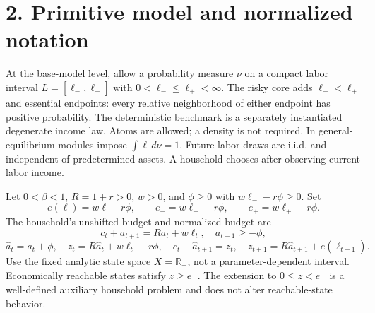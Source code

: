 \documentclass[
  11pt,
]{article}
\begin{document}
\section{2. Primitive model and normalized
notation}\label{primitive-model-and-normalized-notation}

At the base-model level, allow a probability measure \(\nu\) on a
compact labor interval \(L=[\ell_-,\ell_+]\) with
\(0<\ell_-\leq\ell_+<\infty\). The risky core adds \(\ell_-<\ell_+\) and
essential endpoints: every relative neighborhood of either endpoint has
positive probability. The deterministic benchmark is a separately
instantiated degenerate income law. Atoms are allowed; a density is not
required. In general-equilibrium modules impose \(\int\ell\,d\nu=1\).
Future labor draws are i.i.d. and independent of predetermined assets. A
household chooses after observing current labor income.

Let \(0<\beta<1\), \(R=1+r>0\), \(w>0\), and \(\phi\geq0\) with
\(w\ell_- -r\phi\geq0\). Set \[
e(\ell)=w\ell-r\phi,\qquad e_-=w\ell_- -r\phi,\qquad e_+=w\ell_+-r\phi.
\] The household's unshifted budget and normalized budget are \[
c_t+a_{t+1}=R a_t+w\ell_t,\quad a_{t+1}\geq-\phi,
\] \[
\widehat a_t=a_t+\phi,\quad z_t=R\widehat a_t+w\ell_t-r\phi,
\quad c_t+\widehat a_{t+1}=z_t,
\quad z_{t+1}=R\widehat a_{t+1}+e(\ell_{t+1}).
\] Use the fixed analytic state space \(X=\mathbb R_+\), not a
parameter-dependent interval. Economically reachable states satisfy
\(z\geq e_-\). The extension to \(0\leq z<e_-\) is a well-defined
auxiliary household problem and does not alter reachable-state behavior.
\end{document}
